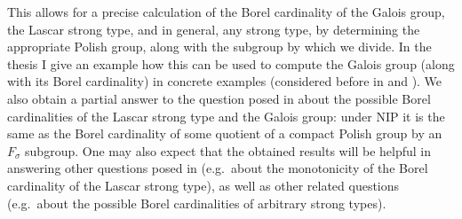 \documentclass[12pt,a4paper]{article}
\begin{document}
	This allows for a precise calculation of the Borel cardinality of the Galois group, the Lascar strong type, and in general, any strong type, by determining the appropriate Polish group, along with the subgroup by which we divide. In the thesis I give an example how this can be used to compute the Galois group (along with its Borel cardinality) in concrete examples (considered before in \cite{CLPZ01} and \cite{KPS13}). We also obtain a partial answer to the question posed in \cite{KPS13} about the possible Borel cardinalities of the Lascar strong type and the Galois group: under NIP it is the same as the Borel cardinality of some quotient of a compact Polish group by an $F_\sigma$ subgroup. One may also expect that the obtained results will be helpful in answering other questions posed in \cite{KPS13} (e.g.\ about the monotonicity of the Borel cardinality of the Lascar strong type), as well as other related questions (e.g.\ about the possible Borel cardinalities of arbitrary strong types).
	\AtNextBibliography{\small}
	\vspace{-1em}
	\printbibliography
\end{document}

